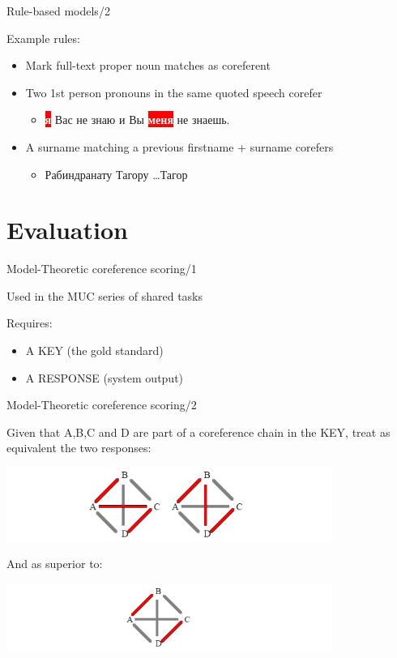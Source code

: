\documentclass[dvipsnames, 10pt, compress]{beamer}
\newcommand{\redfillbox}[1]{\colorbox{red}{\textcolor{white}{{\bf #1}}}}
\begin{document}
\begin{frame}{Rule-based models/2} %

Example rules:

\begin{itemize}
  \item Mark full-text proper noun matches as coreferent
  \item Two 1st person pronouns in the same quoted speech corefer
  \begin{itemize}
    \item \redfillbox{я} Вас не знаю и Вы \redfillbox{меня} не знаешь.
  \end{itemize}  
  \item A surname matching a previous firstname + surname corefers
  \begin{itemize}
     \item Рабиндранату Тагору \ldots Тагор
  \end{itemize}
\end{itemize}

\end{frame}


\section{Evaluation}


\begin{frame}{Model-Theoretic coreference scoring/1}

Used in the MUC series of shared tasks

Requires:
\begin{itemize}
  \item A KEY (the gold standard)
  \item A RESPONSE (system output)
\end{itemize} 

\end{frame}

\begin{frame}{Model-Theoretic coreference scoring/2}

Given that A,B,C and D are part of a coreference 
chain in the KEY, treat as equivalent the two 
responses: 
\begin{center}
\includegraphics[width=0.8\textwidth]{graphics/coref-eval-1.png}
\end{center}

And as superior to: 
\begin{center}
\includegraphics[width=0.8\textwidth]{graphics/coref-eval-2.png}
\end{center}
\end{frame}
\end{document}
